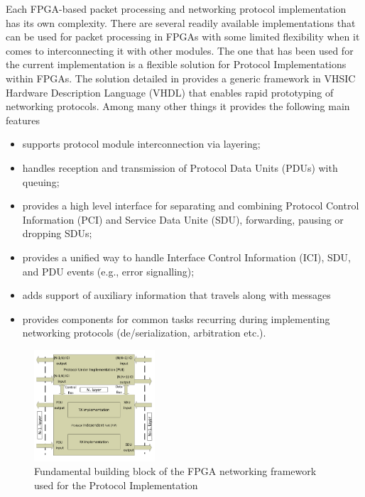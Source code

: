 \documentclass[journal]{IEEEtran}
\begin{document}
Each FPGA-based packet processing and networking protocol implementation has its own complexity. There are several
readily available implementations that can be used for packet processing in FPGAs with some limited flexibility when it
comes to interconnecting it
with other modules. The one that has been used for the current implementation is a flexible solution for Protocol
Implementations within FPGAs. The solution detailed in \cite{ProtoImpl} provides a generic framework in VHSIC Hardware
Description Language (VHDL) that enables rapid prototyping of networking protocols. Among many other things it provides
the following main features
\begin{itemize}
    \renewcommand \labelitemi{--}
    \item supports protocol module interconnection via layering;
    \item handles reception and transmission of Protocol Data Units (PDUs) with queuing;
    \item provides a high level interface for separating and combining	Protocol Control Information (PCI) and Service Data Unite (SDU),
          forwarding, pausing or dropping SDUs;
    \item provides a unified way to handle Interface Control Information (ICI), SDU, and PDU events (e.g., error signalling);
    \item adds support of auxiliary information that travels along with messages
    \item provides components for common tasks recurring during implementing networking protocols
          (de/serialization, arbitration etc.).
\end{itemize}

\begin{figure}[!htb]
    \centering
    \includegraphics[width=0.4\textwidth]{figures_raw/system_sketch.pdf}
    \caption{Fundamental building block of the FPGA networking framework used for the Protocol Implementation}
    \label{fig:system_sketch}
\end{figure}
\end{document}
